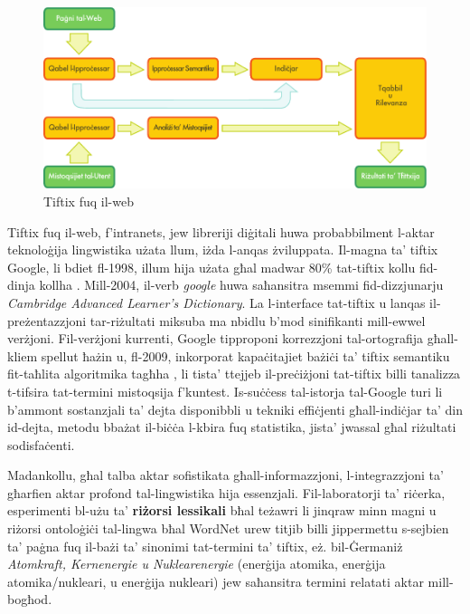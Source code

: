 \documentclass[]{../../metanetpaper}
\begin{document}
\begin{multicols}{2}
\begin{figure}[htb]
  \center
  \includegraphics[width=\textwidth]{../_media/maltese/web_search_architecture}
  \caption{Tiftix fuq il-web}
  \label{fig:websearcharch_mt}
 \end{figure}

Tiftix fuq il-web, f’intranets, jew libreriji diġitali huwa probabbilment l-aktar teknoloġija lingwistika użata llum, iżda l-anqas żviluppata. Il-magna ta’ tiftix Google, li bdiet fl-1998, illum hija użata għal madwar 80\% tat-tiftix kollu fid-dinja kollha \cite{spi1}. Mill-2004, il-verb \emph{google} huwa saħansitra msemmi fid-dizzjunarju \emph{Cambridge Advanced Learner’s Dictionary}. La l-interface tat-tiftix u lanqas il-preżentazzjoni tar-riżultati miksuba ma nbidlu b'mod sinifikanti mill-ewwel verżjoni. Fil-verżjoni kurrenti, Google tipproponi korrezzjoni tal-ortografija għall-kliem spellut ħażin u, fl-2009, inkorporat kapaċitajiet bażiċi ta' tiftix semantiku fit-taħlita algoritmika tagħha \cite{pc1}, li tista’ ttejjeb il-preċiżjoni tat-tiftix billi tanalizza t-tifsira tat-termini mistoqsija f’kuntest. Is-suċċess tal-istorja tal-Google turi li b’ammont sostanzjali ta’ dejta disponibbli u tekniki effiċjenti għall-indiċjar ta’ din id-dejta, metodu bbażat il-biċċa l-kbira fuq statistika, jista’ jwassal għal riżultati sodisfaċenti. 

Madankollu, għal talba aktar sofistikata għall-informazzjoni, l-integrazzjoni ta’ għarfien aktar profond tal-lingwistika hija essenzjali. Fil-laboratorji ta’ riċerka, esperimenti bl-użu ta' \textbf{riżorsi lessikali} bħal teżawri li jinqraw minn magni u riżorsi ontoloġiċi tal-lingwa bħal WordNet urew titjib billi jippermettu s-sejbien ta’ paġna fuq il-bażi ta’ sinonimi tat-termini ta’ tiftix, eż. bil-Ġermaniż \emph{Atomkraft, Kernenergie u Nuklearenergie} (enerġija atomika, enerġija atomika/nukleari, u enerġija nukleari) jew saħansitra termini relatati aktar mill-bogħod.


\end{multicols}
\end{document}

